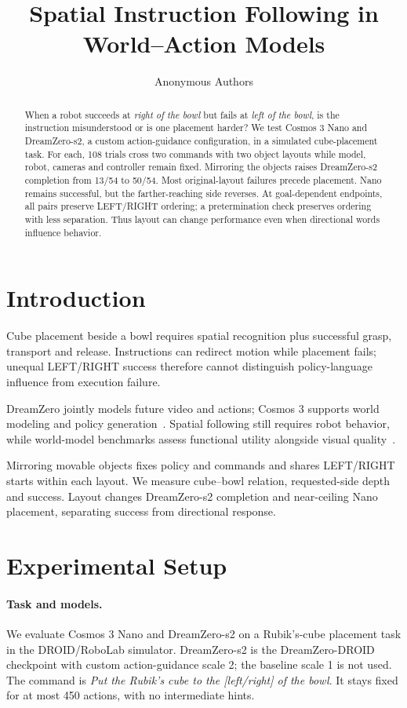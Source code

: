 \documentclass{article}
\title{Spatial Instruction Following in World--Action Models}
\author{Anonymous Authors}
\begin{document}
\maketitle
\begin{abstract}
When a robot succeeds at \emph{right of the bowl} but fails at \emph{left of the bowl}, is the instruction misunderstood or is one placement harder? We test Cosmos 3 Nano and DreamZero-s2, a custom action-guidance configuration, in a simulated cube-placement task. For each, 108 trials cross two commands with two object layouts while model, robot, cameras and controller remain fixed. Mirroring the objects raises DreamZero-s2 completion from 13/54 to 50/54. Most original-layout failures precede placement. Nano remains successful, but the farther-reaching side reverses. At goal-dependent endpoints, all pairs preserve LEFT/RIGHT ordering; a pretermination check preserves ordering with less separation. Thus layout can change performance even when directional words influence behavior.
\end{abstract}

\section{Introduction}
Cube placement beside a bowl requires spatial recognition plus successful grasp, transport and release. Instructions can redirect motion while placement fails; unequal LEFT/RIGHT success therefore cannot distinguish policy-language influence from execution failure.

DreamZero jointly models future video and actions; Cosmos 3 supports world modeling and policy generation~\citep{ye2026dreamzero,nvidia2026cosmos3}. Spatial following still requires robot behavior, while world-model benchmarks assess functional utility alongside visual quality~\citep{shang2026worldarena}.

Mirroring movable objects fixes policy and commands and shares LEFT/RIGHT starts within each layout. We measure cube--bowl relation, requested-side depth and success. Layout changes DreamZero-s2 completion and near-ceiling Nano placement, separating success from directional response.

\section{Experimental Setup}
\paragraph{Task and models.}
We evaluate Cosmos 3 Nano and DreamZero-s2 on a Rubik's-cube placement task in the DROID/RoboLab simulator. DreamZero-s2 is the DreamZero-DROID checkpoint with custom action-guidance scale 2; the baseline scale 1 is not used. The command is \emph{Put the Rubik's cube to the [left/right] of the bowl}. It stays fixed for at most 450 actions, with no intermediate hints.
\end{document}
